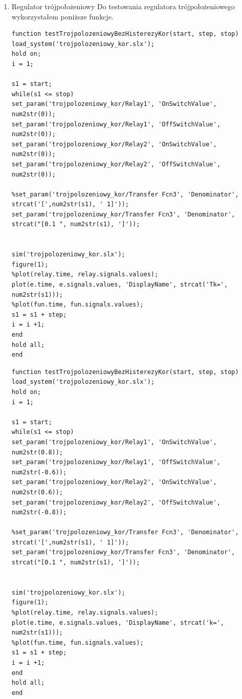 \documentclass[a4paper,10pt]{article}
\begin{document}
\begin{enumerate}
\newpage


		\item Regulator trójpołożeniowy
Do testowania regulatora trójpołożeniowego wykorzystałem poniższe funkcje.

\begin{lstlisting}[caption=Funkcja testująca regulator trójpołożeniowy bez histerezy.]
function testTrojpolozeniowyBezHisterezyKor(start, step, stop)
load_system('trojpolozeniowy_kor.slx');
hold on;
i = 1;

s1 = start;
while(s1 <= stop)
set_param('trojpolozeniowy_kor/Relay1', 'OnSwitchValue', num2str(0));
set_param('trojpolozeniowy_kor/Relay1', 'OffSwitchValue', num2str(0));
set_param('trojpolozeniowy_kor/Relay2', 'OnSwitchValue', num2str(0));
set_param('trojpolozeniowy_kor/Relay2', 'OffSwitchValue', num2str(0));

%set_param('trojpolozeniowy_kor/Transfer Fcn3', 'Denominator', strcat('[',num2str(s1), ' 1]'));
set_param('trojpolozeniowy_kor/Transfer Fcn3', 'Denominator', strcat("[0.1 ", num2str(s1), ']'));


sim('trojpolozeniowy_kor.slx');
figure(1);
%plot(relay.time, relay.signals.values);
plot(e.time, e.signals.values, 'DisplayName', strcat('Tk=', num2str(s1)));
%plot(fun.time, fun.signals.values);
s1 = s1 + step;
i = i +1;
end
hold all;
end
\end{lstlisting}
		
\begin{lstlisting}[caption=Funkcja testująca regulator trójpołożeniowy z histerezą.]
function testTrojpolozeniowyBezHisterezyKor(start, step, stop)
load_system('trojpolozeniowy_kor.slx');
hold on;
i = 1;

s1 = start;
while(s1 <= stop)
set_param('trojpolozeniowy_kor/Relay1', 'OnSwitchValue', num2str(0.8));
set_param('trojpolozeniowy_kor/Relay1', 'OffSwitchValue', num2str(-0.6));
set_param('trojpolozeniowy_kor/Relay2', 'OnSwitchValue', num2str(0.6));
set_param('trojpolozeniowy_kor/Relay2', 'OffSwitchValue', num2str(-0.8));

%set_param('trojpolozeniowy_kor/Transfer Fcn3', 'Denominator', strcat('[',num2str(s1), ' 1]'));
set_param('trojpolozeniowy_kor/Transfer Fcn3', 'Denominator', strcat("[0.1 ", num2str(s1), ']'));


sim('trojpolozeniowy_kor.slx');
figure(1);
%plot(relay.time, relay.signals.values);
plot(e.time, e.signals.values, 'DisplayName', strcat('k=', num2str(s1)));
%plot(fun.time, fun.signals.values);
s1 = s1 + step;
i = i +1;
end
hold all;
end
\end{lstlisting}


\end{enumerate}
\end{document}
